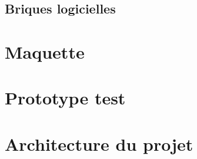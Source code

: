 \documentclass[paper=a4, fontsize=11pt]{scrartcl}
\numberwithin{equation}{section}		%
\numberwithin{figure}{section}			%
\numberwithin{table}{section}				%
\begin{document}
\subsection{Briques logicielles}


\section{Maquette}


\section{Prototype test}



\section{Architecture du projet}




\end{document}
